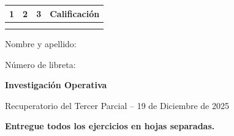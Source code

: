 \documentclass[a4paper,oneside,12pt]{amsart}
\newcommand{\nombremateria}
{Investigaci\'on Operativa}
\newcommand{\numeroparcial}
    { Recuperatorio del Tercer Parcial }
\newcommand{\fecha}
    {19 de Diciembre de 2025}
\theoremstyle{definition}
\begin{document}
\hfill \hfill
\begin{tabular}[c]{|c|c|c|c|}
\hline 
1 & 2 & 3 & Calificaci\'on \\ \hline \hline
\hspace{1.2 cm} & \hspace{1.2 cm} & \hspace{1.2 cm} &\hspace{1.5 cm} \\
\hspace{1.2 cm} & \hspace{1.2 cm} & \hspace{1.2 cm} &\hspace{1.5 cm} \\ \hline

\end{tabular}

\vspace{-1cm}

\noindent Nombre y apellido:

\vspace{0.2cm}

\noindent Número de libreta:

\noindent \hrulefill 

\smallskip
\renewcommand{\baselinestretch}{1.1}

\begin{center}
	\large \textbf{\nombremateria} 
	
	\numeroparcial -- \fecha
\end{center}

\begin{center}
\textbf{Entregue todos los ejercicios en hojas separadas.}
\end{center}

\vspace{.6cm}
\renewcommand{\theenumi}{\textbf{\arabic{enumi}}}

\end{document}
